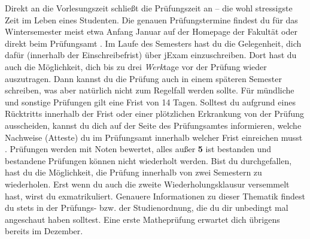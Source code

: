\label{sec:pruefungen}
Direkt an die Vorlesungszeit schließt die Prüfungszeit an – die wohl stressigste Zeit im Leben eines Studenten.
Die genauen Prüfungstermine findest du für das Wintersemester meist etwa Anfang Januar auf der Homepage der Fakultät  oder direkt beim Prüfungsamt .
Im Laufe des Semesters hast du die Gelegenheit, dich dafür (innerhalb der Einschreibefrist) über jExam einzuschreiben.
Dort hast du auch die Möglichkeit, dich bis zu drei \emph{Werk}tage vor der Prüfung wieder auszutragen. Dann kannst du die Prüfung auch in einem späteren Semester schreiben, was aber natürlich
nicht zum Regelfall werden sollte. Für mündliche und sonstige Prüfungen gilt eine Frist von 14 Tagen.
Solltest du aufgrund eines Rücktritts innerhalb der Frist oder einer plötzlichen Erkrankung von der Prüfung ausscheiden, kannst du dich auf der Seite des Prüfungsamtes informieren,
welche Nachweise (Atteste) du im Prüfungsamt innerhalb welcher Frist einreichen musst .
Prüfungen werden mit Noten bewertet, alles außer \textbf{5} ist bestanden und bestandene Prüfungen können nicht wiederholt werden.
Bist du durchgefallen, hast du die Möglichkeit, die Prüfung innerhalb von zwei Semestern zu wiederholen. Erst wenn du auch die zweite Wiederholungsklausur versemmelt hast, wirst du exmatrikuliert.
Genauere Informationen zu dieser Thematik findest du stets in der Prüfungs- bzw. der Studienordnung, die du dir unbedingt mal angeschaut haben solltest.
Eine erste Matheprüfung erwartet dich übrigens bereits im Dezember.

